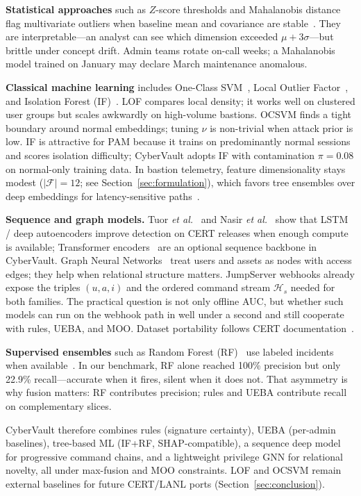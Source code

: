 \documentclass{ieeeaccess}
\begin{document}
\textbf{Statistical approaches} such as $Z$-score thresholds and Mahalanobis distance flag multivariate outliers when baseline mean and covariance are stable~\cite{ref7}. They are interpretable---an analyst can see which dimension exceeded $\mu+3\sigma$---but brittle under concept drift. Admin teams rotate on-call weeks; a Mahalanobis model trained on January may declare March maintenance anomalous.

\textbf{Classical machine learning} includes One-Class SVM~\cite{ref20}, Local Outlier Factor~\cite{ref19}, and Isolation Forest (IF)~\cite{ref8}. LOF compares local density; it works well on clustered user groups but scales awkwardly on high-volume bastions. OCSVM finds a tight boundary around normal embeddings; tuning $\nu$ is non-trivial when attack prior is low. IF is attractive for PAM because it trains on predominantly normal sessions and scores isolation difficulty; CyberVault adopts IF with contamination $\pi=0.08$ on normal-only training data. In bastion telemetry, feature dimensionality stays modest ($|\mathcal{F}|=12$; see Section~\ref{sec:formulation}), which favors tree ensembles over deep embeddings for latency-sensitive paths~\cite{ref7,ref8}.

\textbf{Sequence and graph models.} Tuor \textit{et al.}~\cite{ref10} and Nasir \textit{et al.}~\cite{ref31} show that LSTM / deep autoencoders improve detection on CERT releases when enough compute is available; Transformer encoders~\cite{ref36} are an optional sequence backbone in CyberVault. Graph Neural Networks~\cite{ref23,ref37} treat users and assets as nodes with access edges; they help when relational structure matters. JumpServer webhooks already expose the triples $(u,a,i)$ and the ordered command stream $\mathcal{H}_s$ needed for both families. The practical question is not only offline AUC, but whether such models can run on the webhook path in well under a second and still cooperate with rules, UEBA, and MOO. Dataset portability follows CERT documentation~\cite{ref43}.

\textbf{Supervised ensembles} such as Random Forest (RF)~\cite{ref30} use labeled incidents when available~\cite{ref9,ref11}. In our benchmark, RF alone reached 100\% precision but only 22.9\% recall---accurate when it fires, silent when it does not. That asymmetry is why fusion matters: RF contributes precision; rules and UEBA contribute recall on complementary slices.

CyberVault therefore combines rules (signature certainty), UEBA (per-admin baselines), tree-based ML (IF+RF, SHAP-compatible), a sequence deep model for progressive command chains, and a lightweight privilege GNN for relational novelty, all under max-fusion and MOO constraints. LOF and OCSVM remain external baselines for future CERT/LANL ports (Section~\ref{sec:conclusion}).
\end{document}
